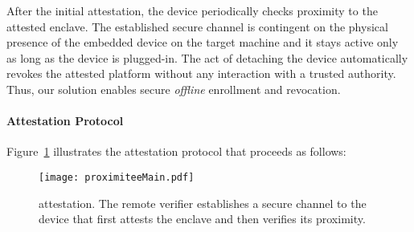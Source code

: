 After the initial attestation, the device periodically checks proximity to the attested enclave. The established secure channel is contingent on the physical presence of the embedded device on the target machine and it stays active only as long as the device is plugged-in. The act of detaching the device automatically revokes the attested platform without any interaction with a trusted authority. Thus, our solution enables secure \emph{offline} enrollment and revocation. 


\paragraph{Attestation Protocol} Figure~\ref{fig:systemSetUp} illustrates the \proximitee attestation protocol that proceeds as follows:


\begin{figure}[t]
 \centering
  \texttt{[image: proximiteeMain.pdf]}
 \caption{\proximitee attestation. The remote verifier establishes a secure channel to the \key device that first attests the enclave and then verifies its proximity.}
 \label{fig:systemSetUp}
\end{figure}

